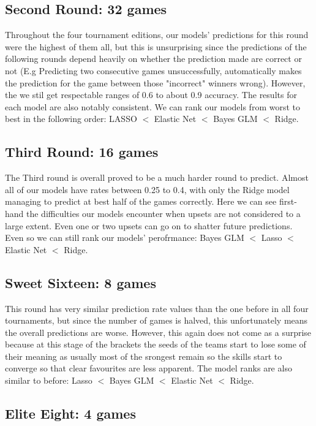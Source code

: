 \documentclass{article} %
\begin{document}
\subsection{Second Round: 32 games}

Throughout the four tournament editions, our models' predictions for this round were the highest of them all, but this is unsurprising since the predictions of the following rounds depend heavily on whether the prediction made are correct or not (E.g Predicting two consecutive games unsuccessfully, automatically makes the prediction for the game between those "incorrect" winners wrong). However, the we stil get respectable ranges of 0.6 to about 0.9 accuracy. The results for each model are also notably consistent. We can rank our models from worst to best in the following order: LASSO $<$ Elastic Net $<$ Bayes GLM $<$ Ridge.

\subsection{Third Round: 16 games}

The Third round is overall proved to be a much harder round to predict. Almost all of our models have rates between 0.25 to 0.4, with only the Ridge model managing to predict at best half of the games correctly. Here we can see first-hand the difficulties our models encounter when upsets are not considered to a large extent. Even one or two upsets can go on to shatter future predictions. Even so we can still rank our models' perofrmance: Bayes GLM $<$ Lasso $<$ Elastic Net $<$ Ridge.

\subsection{Sweet Sixteen: 8 games}

This round has very similar prediction rate values than the one before in all four tournaments, but since the number of games is halved, this unfortunately means the overall predictions are worse. However, this again does not come as a surprise because at this stage of the brackets the seeds of the teams start to lose some of their meaning as usually most of the srongest remain so the skills start to converge so that clear favourites are less apparent. The model ranks are also similar to before: Lasso $<$ Bayes GLM $<$ Elastic Net $<$ Ridge.   

\subsection{Elite Eight: 4 games}
\end{document}

